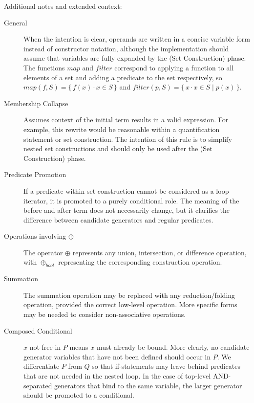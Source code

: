 \documentclass{article}
\newcommand{\bSet}[3]{%
  \{\, #1 \cdot #2 \mid #3 \, \}%
}
\newcommand{\bSetT}[2]{%
  \{\, #1 \cdot #2 \,\}%
}
\begin{document}
Additional notes and extended context:
\begin{description}
  \item[General] When the intention is clear, operands are written in a concise variable form instead of constructor notation, although the implementation should assume that variables are fully expanded by the (Set Construction) phase. The functions $map$ and $filter$ correspond to applying a function to all elements of a set and adding a predicate to the set respectively, so $map(f,S) = \bSetT{f(x)}{x \in S}$ and $filter(p, S) = \bSet{x}{x \in S}{p(x)}$.
  \item[Membership Collapse] Assumes context of the initial term results in a valid expression. For example, this rewrite would be reasonable within a quantification statement or set construction. The intention of this rule is to simplify nested set constructions and should only be used after the (Set Construction) phase.
  \item[Predicate Promotion] If a predicate within set construction cannot be considered as a loop iterator, it is promoted to a purely conditional role. The meaning of the before and after term does not necessarily change, but it clarifies the difference between candidate generators and regular predicates.
  \item[Operations involving $\oplus$] The operator $\oplus$ represents any union, intersection, or difference operation, with $\oplus_{bool}$ representing the corresponding construction operation.
  \item[Summation] The summation operation may be replaced with any reduction/folding operation, provided the correct low-level operation. More specific forms may be needed to consider non-associative operations.
  \item[Composed Conditional] $x$ not free in $P$ means $x$ must already be bound. More clearly, no candidate generator variables that have not been defined should occur in $P$. We differentiate $P$ from $Q$ so that if-statements may leave behind predicates that are not needed in the nested loop. In the case of top-level AND-separated generators that bind to the same variable, the larger generator should be promoted to a conditional.
\end{description}
\end{document}
